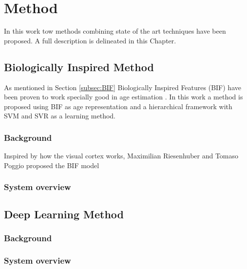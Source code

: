 \chapter{Method} \label{chap:method}
In this work tow methods combining state of the art techniques have been proposed. A full description is delineated in this Chapter.

\section{Biologically Inspired Method}
As mentioned in Section \ref{subsec:BIF} Biologically Inspired Features (BIF) have been proven to work specially good in age estimation \cite{Riesenhuber99hierarchicalmodels}\cite{conf/cvpr/GuoMFH09}\cite{han:age}. In this work a method is proposed using BIF as age representation and a hierarchical framework with SVM and SVR as a learning method.
 
\subsection{Background}

Inspired by how the visual cortex works, Maximilian Riesenhuber and Tomaso Poggio proposed the BIF model


\subsection{System overview}

\section{Deep Learning Method}
\subsection{Background}
\subsection{System overview}